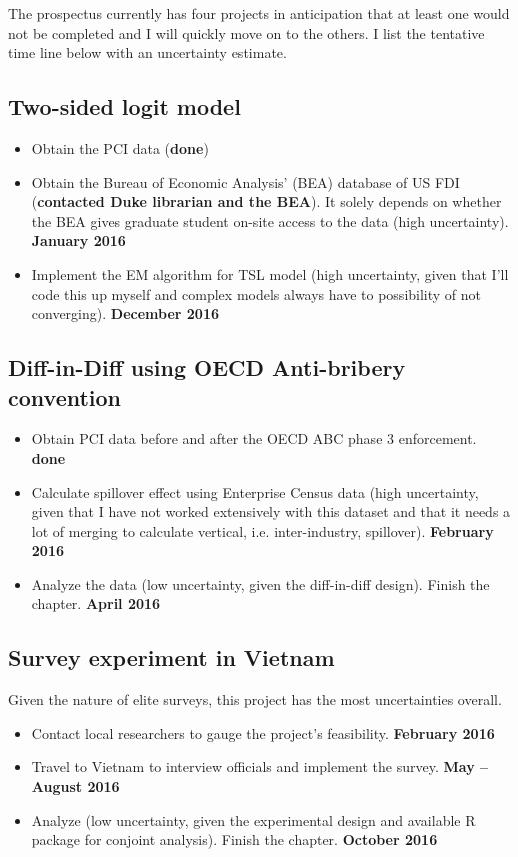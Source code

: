 The prospectus currently has four projects in anticipation that at least one would not be completed and I will quickly move on to the others. I list the tentative time line below with an uncertainty estimate.

\subsection{Two-sided logit model}
\begin{itemize}
\item Obtain the PCI data (\textbf{done})
\item Obtain the Bureau of Economic Analysis' (BEA) database of US FDI (\textbf{contacted Duke librarian and the BEA}). It solely depends on whether the BEA gives graduate student on-site access to the data (high uncertainty). \textbf{January 2016}
\item Implement the EM algorithm for TSL model (high uncertainty, given that I'll code this up myself and complex models always have to possibility of not converging). \textbf{December 2016}
\end{itemize}

\subsection{Diff-in-Diff using OECD Anti-bribery convention}

\begin{itemize}
\item Obtain PCI data before and after the OECD ABC phase 3 enforcement. \textbf{done}
\item Calculate spillover effect using Enterprise Census data (high uncertainty, given that I have not worked extensively with this dataset and that it needs a lot of merging to calculate vertical, i.e. inter-industry, spillover). \textbf{February 2016}
\item Analyze the data (low uncertainty, given the diff-in-diff design). Finish the chapter. \textbf{April 2016}
\end{itemize}

\subsection{Survey experiment in Vietnam}

Given the nature of elite surveys, this project has the most uncertainties overall.

\begin{itemize}
\item Contact local researchers to gauge the project's feasibility. \textbf{February 2016}
\item Travel to Vietnam to interview officials and implement the survey. \textbf{May -- August 2016}
\item Analyze (low uncertainty, given the experimental design and available R package for conjoint analysis). Finish the chapter. \textbf{October 2016}
\end{itemize}

